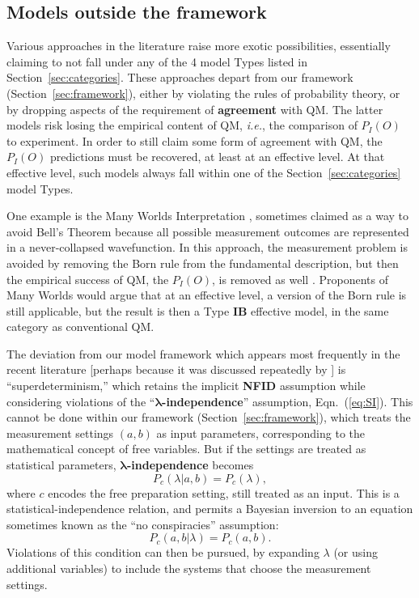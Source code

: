 \documentclass[onecolumn, nofootinbib, 12pt]{revtex4-1}
\begin{document}
\subsection{Models outside the framework}
\label{sec:superdeterminism}

Various approaches in the literature raise more exotic possibilities, essentially claiming to not fall under any of the 4 model Types listed in Section~\ref{sec:categories}.  These approaches depart from our framework (Section~\ref{sec:framework}), either by violating the rules of probability theory, or by dropping aspects of the requirement of {\bf agreement} with QM\@.  The latter models risk losing the empirical content of QM, \emph{i.e.}, the comparison of $P_I(O)$ to experiment.  In order to still claim some form of agreement with QM, the $P_I(O)$ predictions must be recovered, at least at an effective level.  At that effective level, such models always fall within one of the Section~\ref{sec:categories} model Types.

One example is the Many Worlds Interpretation \cite{everett1957}, sometimes claimed as a way to avoid Bell's Theorem because all possible measurement outcomes are represented in a never-collapsed wavefunction.  In this approach, the measurement problem is avoided by removing the Born rule from the fundamental description, but then the empirical success of QM, the $P_I(O)$, is removed as well \cite{maudlin2010}.  Proponents of Many Worlds would argue that at an effective level, a version of the Born rule is still applicable, but the result is then a Type {\bf IB} effective model, in the same category as conventional QM\@. 

The deviation from our model framework which appears most frequently in the recent literature [perhaps because it was discussed repeatedly by \textcite{bell1981,bell1990,bell1977}] is ``superdeterminism,'' which retains the implicit {\bf NFID} assumption while considering violations of the ``{\bf $\bm{\lambda}$-independence}'' assumption, Eqn.~(\ref{eq:SI}).  This cannot be done within our framework (Section~\ref{sec:framework}), which treats the measurement settings $(a,b)$ as input parameters, corresponding to the mathematical concept of free variables.  But if the settings are treated as statistical parameters, {\bf $\bm{\lambda}$-independence} becomes
\begin{equation}
\label{eq:MeasInd}
 P_{c}(\lambda |a,b)=P_c(\lambda),
 \end{equation}
where $c$ encodes the free preparation setting, still treated as an input.  This is a statistical-independence relation, and permits a Bayesian inversion to an equation sometimes known as the ``no conspiracies'' assumption:
\begin{equation}
\label{eq:FreeWill}
 P_{c}(a,b|\lambda)=P_c(a,b).
 \end{equation}
Violations of this condition can then be pursued, by expanding $\lambda$ (or using additional variables) to include the systems that choose the measurement settings.
\end{document}
